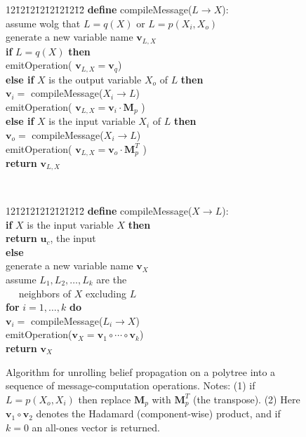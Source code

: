 \documentclass{article}
\newcommand{\vek}[1]{\textbf{#1}}
\newcommand{\M}{\textbf{M}}
\newenvironment{alg}{\begin{minipage}[t]{\textwidth}\begin{tabbing}12\=12\=12\=12\=12\=12\=12\=12\=\kill}{\end{tabbing}\end{minipage}}
\begin{document}
\begin{figure}
\begin{center}
\begin{small}
\begin{alg}
\textbf{define} compileMessage($L \rightarrow X$):\\
\> assume wolg that $L=q(X)$ or $L=p(X_i,X_o)$\\
\> generate a new variable name  $\vek{v}_{L,X}$  \\
\> \textbf{if} $L=q(X)$ \textbf{then}\\
\> \>  emitOperation( $\vek{v}_{L,X} = \vek{v}_q$)\\
\> \textbf{else if} $X$ is the output variable $X_o$ of $L$ \textbf{then}\\
\> \> $\vek{v}_i =$ compileMessage($X_i \rightarrow L$)\\
\> \> emitOperation( $\vek{v}_{L,X} = \vek{v}_i \cdot \M_p$ )\\
\> \textbf{else if} $X$ is the input variable $X_i$ of $L$ \textbf{then}\\
\> \> $\vek{v}_o =$ compileMessage($X_i \rightarrow L$) \\%
\> \> emitOperation( $\vek{v}_{L,X} = \vek{v}_o \cdot \M_p^T$ ) \\ 
\> \textbf{return} $\vek{v}_{L,X}$\\
\end{alg}~~~~\begin{alg}
\textbf{define} compileMessage($X \rightarrow L$):  \\
\> \textbf{if} $X$ is the input variable $X$ \textbf{then}\\
\> \> \textbf{return} $\vek{u}_c$, the input\\
\> \textbf{else}\\
\> \> generate a new variable name $\vek{v}_X$\\
\> \> assume $L_1,L_2,\ldots,L_k$ are the \\
\> \> ~~ neighbors of $X$ excluding $L$ \\
\> \> \textbf{for} $i=1,\ldots,k$ \textbf{do}\\
\> \> \> $\vek{v}_i =$ compileMessage($L_i \rightarrow X$)\\
\> \> emitOperation($\vek{v}_X = \vek{v}_1 \circ \cdots \circ \vek{v}_k$) \\
\> \> \textbf{return} $\vek{v}_X$\\
\end{alg}
\end{small}
\end{center}
\caption{\small Algorithm for unrolling belief propagation on a
  polytree into a sequence of message-computation operations. Notes:
  (1) if $L=p(X_o,X_i)$ then replace $\M_p$ with $\M_p^T$ (the
  transpose). (2) Here $\vek{v}_1 \circ \vek{v}_2$ denotes the
  Hadamard (component-wise) product, and if $k=0$ an all-ones vector
  is returned.} \label{fig:alg}
\end{figure}
\end{document}

